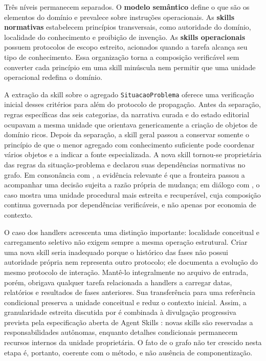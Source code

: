 \documentclass[preprint,12pt,authoryear]{elsarticle}
\begin{document}
Três níveis permanecem separados. O \textbf{modelo semântico} define o que são os elementos do domínio e prevalece sobre instruções operacionais. As \textbf{skills normativas} estabelecem princípios transversais, como autoridade do domínio, localidade do conhecimento e proibição de invenção. As \textbf{skills operacionais} possuem protocolos de escopo estreito, acionados quando a tarefa alcança seu tipo de conhecimento. Essa organização torna a composição verificável sem converter cada princípio em uma skill minúscula nem permitir que uma unidade operacional redefina o domínio.

A extração da skill sobre o agregado \texttt{SituacaoProblema} oferece uma verificação inicial desses critérios para além do protocolo de propagação. Antes da separação, regras específicas das seis categorias, da narrativa curada e do estado editorial ocupavam a mesma unidade que orientava genericamente a criação de objetos de domínio ricos. Depois da separação, a skill geral passou a conservar somente o princípio de que o menor agregado com conhecimento suficiente pode coordenar vários objetos e a indicar a fonte especializada. A nova skill tornou-se proprietária das regras da situação-problema e declarou suas dependências normativas no grafo. Em consonância com \citet{parnas1972criteria}, a evidência relevante é que a fronteira passou a acompanhar uma decisão sujeita a razão própria de mudança; em diálogo com \citet{badhe2026survey,zare2026microskill}, o caso mostra uma unidade procedural mais estreita e recuperável, cuja composição continua governada por dependências verificáveis, e não apenas por economia de contexto.

O caso dos handlers acrescenta uma distinção importante: localidade conceitual e carregamento seletivo não exigem sempre a mesma operação estrutural. Criar uma nova skill seria inadequado porque o histórico das fases não possui autoridade própria nem representa outro protocolo; ele documenta a evolução do mesmo protocolo de interação. Mantê-lo integralmente no arquivo de entrada, porém, obrigava qualquer tarefa relacionada a handlers a carregar datas, relatórios e resultados de fases anteriores. Sua transferência para uma referência condicional preserva a unidade conceitual e reduz o contexto inicial. Assim, a granularidade estreita discutida por \citet{zare2026microskill} é combinada à divulgação progressiva prevista pela especificação aberta de Agent Skills \citep{agentskills2026spec}: novas skills são reservadas a responsabilidades autônomas, enquanto detalhes condicionais permanecem recursos internos da unidade proprietária. O fato de o grafo não ter crescido nesta etapa é, portanto, coerente com o método, e não ausência de componentização.
\end{document}
